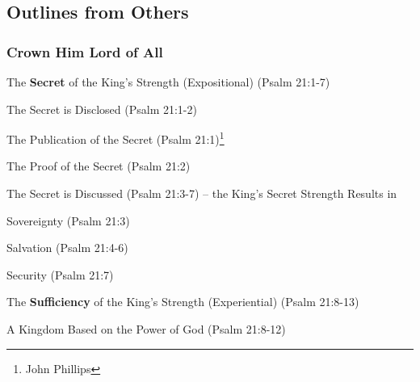 \subsection{Outlines from Others}

\subsubsection{Crown Him Lord of All}


\begin{compactenum}[I.][7]
    \item The  \textbf{Secret} of the King's Strength (Expositional) (Psalm 21:1-7)
    \begin{compactenum}[A.][2]
        \item The Secret is Disclosed (Psalm 21:1-2)
        \begin{compactenum}[1.]
            \item The Publication of the Secret (Psalm 21:1)\footnote{John Phillips}
            \item The Proof of the Secret (Psalm 21:2)
        \end{compactenum}
        \item The Secret is Discussed (Psalm 21:3-7) -- the King's Secret Strength Results in
        \begin{compactenum}[1.]
            \item Sovereignty (Psalm 21:3)
            \item Salvation (Psalm 21:4-6)
            \item Security (Psalm 21:7)
        \end{compactenum}
    \end{compactenum}
    \item The  \textbf{Sufficiency} of the King's Strength (Experiential) (Psalm 21:8-13)
    \begin{compactenum}[A.][2]
        \item A Kingdom Based on the Power of God (Psalm 21:8-12)

\end{compactenum}
\end{compactenum}
